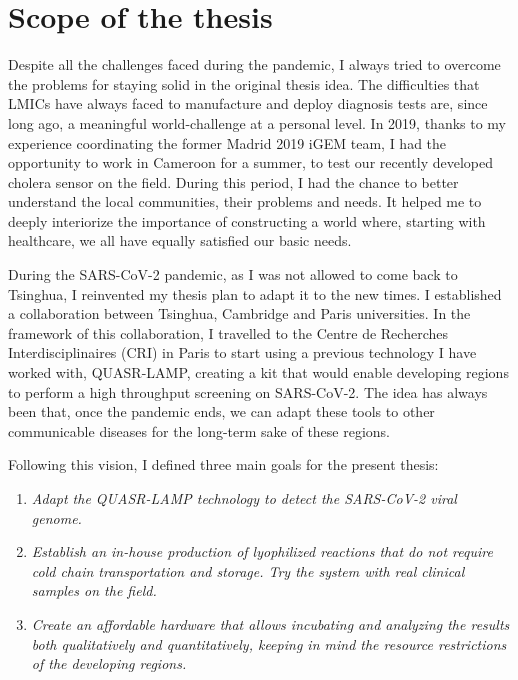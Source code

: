 \section{Scope of the thesis}
Despite all the challenges faced during the pandemic, I always tried to overcome the problems for staying solid in the original thesis idea. The difficulties that LMICs have always faced to manufacture and deploy diagnosis tests are, since long ago, a meaningful world-challenge at a personal level. In 2019, thanks to my experience coordinating the former Madrid 2019 iGEM team\cite{igem_madrid_2019_aegis_2019}, I had the opportunity to work in Cameroon for a summer, to test our recently developed cholera sensor on the field. During this period, I had the chance to better understand the local communities, their problems and needs. It helped me to deeply interiorize the importance of constructing a world where, starting with healthcare, we all have equally satisfied our basic needs. 

During the SARS-CoV-2 pandemic, as I was not allowed to come back to Tsinghua, I reinvented my thesis plan to adapt it to the new times. I established a collaboration between Tsinghua, Cambridge and Paris universities. In the framework of this collaboration, I travelled to the Centre de Recherches Interdisciplinaires (CRI) in Paris to start using a previous technology I have worked with, QUASR-LAMP, creating a kit that would enable developing regions to perform a high throughput screening on SARS-CoV-2. The idea has always been that, once the pandemic ends, we can adapt these tools  to other communicable diseases for the long-term sake of these regions.

\vspace{12pt}
Following this vision, I defined three main goals for the present thesis:
\vspace{8pt}
\begin{enumerate}
   \item \emph{Adapt the QUASR-LAMP technology to detect the SARS-CoV-2 viral genome.}
   \item \emph{Establish an in-house production of lyophilized reactions that do not require cold chain transportation and storage. Try the system with real clinical samples on the field.}
   \item \emph{Create an affordable hardware that allows incubating and analyzing the results both qualitatively and quantitatively, keeping in mind the resource restrictions of the developing regions.}
\end{enumerate}